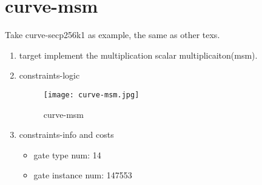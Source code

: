 \section{curve-msm}
\label{curve-msm}

Take curve-secp256k1 as example, the same as other texs.

\begin{enumerate}
    \item target
        implement the multiplication scalar multiplicaiton(msm). 
    \item constraints-logic
        \begin{figure}[!ht]
            \centering
            \texttt{[image: curve-msm.jpg]}
            \caption{curve-msm}
            \label{fig:curve-msm}
        \end{figure}
    
    \item constraints-info and costs
        \begin{itemize}
            \item gate type num: 14
            \item gate instance num: 147553
        \end{itemize}
\end{enumerate}